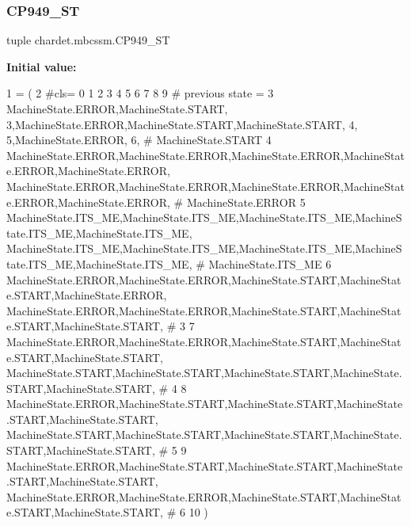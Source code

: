 \subsubsection{\texorpdfstring{C\+P949\+\_\+\+ST}{CP949\_ST}}
{\footnotesize\ttfamily tuple chardet.\+mbcssm.\+C\+P949\+\_\+\+ST}

{\bfseries Initial value\+:}
\begin{DoxyCode}
1 =  (
2 \textcolor{comment}{#cls=    0      1      2      3      4      5      6      7      8      9  # previous state =}
3     MachineState.ERROR,MachineState.START,     3,MachineState.ERROR,MachineState.START,MachineState.START, 
          4,     5,MachineState.ERROR,     6, \textcolor{comment}{# MachineState.START}
4     MachineState.ERROR,MachineState.ERROR,MachineState.ERROR,MachineState.ERROR,MachineState.ERROR,
      MachineState.ERROR,MachineState.ERROR,MachineState.ERROR,MachineState.ERROR,MachineState.ERROR, \textcolor{comment}{# MachineState.ERROR}
5     MachineState.ITS\_ME,MachineState.ITS\_ME,MachineState.ITS\_ME,MachineState.ITS\_ME,MachineState.ITS\_ME,
      MachineState.ITS\_ME,MachineState.ITS\_ME,MachineState.ITS\_ME,MachineState.ITS\_ME,MachineState.ITS\_ME, \textcolor{comment}{#
       MachineState.ITS\_ME}
6     MachineState.ERROR,MachineState.ERROR,MachineState.START,MachineState.START,MachineState.ERROR,
      MachineState.ERROR,MachineState.ERROR,MachineState.START,MachineState.START,MachineState.START, \textcolor{comment}{# 3}
7     MachineState.ERROR,MachineState.ERROR,MachineState.START,MachineState.START,MachineState.START,
      MachineState.START,MachineState.START,MachineState.START,MachineState.START,MachineState.START, \textcolor{comment}{# 4}
8     MachineState.ERROR,MachineState.START,MachineState.START,MachineState.START,MachineState.START,
      MachineState.START,MachineState.START,MachineState.START,MachineState.START,MachineState.START, \textcolor{comment}{# 5}
9     MachineState.ERROR,MachineState.START,MachineState.START,MachineState.START,MachineState.START,
      MachineState.ERROR,MachineState.ERROR,MachineState.START,MachineState.START,MachineState.START, \textcolor{comment}{# 6}
10 )
\end{DoxyCode}
\mbox{\label{namespacechardet_1_1mbcssm_a85e3044bd5dd4a8f1a32b7585ca95167}} 

